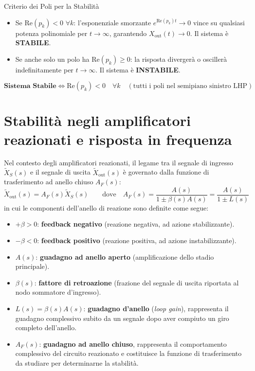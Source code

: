 \begin{teorema}{Criterio dei Poli per la Stabilità}
\begin{itemize}
    \item Se $\text{Re}(p_k) < 0 \,\, \forall k$: l'esponenziale smorzante $e^{\text{Re}(p_k) t} \to 0$ vince su qualsiasi potenza polinomiale per $t \to \infty$, garantendo $X_{\text{out}}(t) \to 0$. Il sistema è \textbf{STABILE}.
    \item Se anche solo un polo ha $\text{Re}(p_k) \ge 0$: la risposta divergerà o oscillerà indefinitamente per $t \to \infty$. Il sistema è \textbf{INSTABILE}.
\end{itemize}
\[
    \boxed{\textbf{Sistema Stabile} \iff \text{Re}(p_k) < 0 \quad \forall k \quad (\text{tutti i poli nel semipiano sinistro LHP})}
\]
\end{teorema}

\section{Stabilità negli amplificatori reazionati e risposta in frequenza}

Nel contesto degli amplificatori reazionati, il legame tra il segnale di ingresso $\tilde{X}_S(s)$ e il segnale di uscita $\tilde{X}_{\text{out}}(s)$ è governato dalla funzione di trasferimento ad anello chiuso $A_F(s)$:
\[
    \tilde{X}_{\text{out}}(s) = A_F(s) \tilde{X}_S(s) \qquad \text{dove} \quad A_F(s) = \frac{A(s)}{1 \pm \beta(s) A(s)} = \frac{A(s)}{1 \pm L(s)}
\]
in cui le componenti dell'anello di reazione sono definite come segue:
\begin{itemize}
    \item $+\beta > 0$: \textbf{feedback negativo} (reazione negativa, ad azione stabilizzante).
    \item $-\beta < 0$: \textbf{feedback positivo} (reazione positiva, ad azione instabilizzante).
    \item $A(s)$: \textbf{guadagno ad anello aperto} (amplificazione dello stadio principale).
    \item $\beta(s)$: \textbf{fattore di retroazione} (frazione del segnale di uscita riportata al nodo sommatore d'ingresso).
    \item $L(s) = \beta(s) A(s)$: \textbf{guadagno d'anello} (\emph{loop gain}), rappresenta il guadagno complessivo subito da un segnale dopo aver compiuto un giro completo dell'anello.
    \item $A_F(s)$: \textbf{guadagno ad anello chiuso}, rappresenta il comportamento complessivo del circuito reazionato e costituisce la funzione di trasferimento da studiare per determinarne la stabilità.
\end{itemize}

